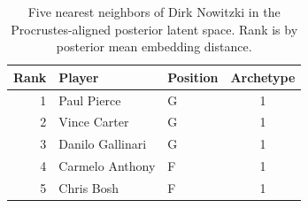 \begin{table}[htbp]
  \centering\small
  \begin{tabular}{rllc}
    \toprule
    Rank & Player & Position & Archetype \\
    \midrule
    1 & Paul Pierce & G & 1 \\
    2 & Vince Carter & G & 1 \\
    3 & Danilo Gallinari & G & 1 \\
    4 & Carmelo Anthony & F & 1 \\
    5 & Chris Bosh & F & 1 \\
    \bottomrule
  \end{tabular}
  \caption{Five nearest neighbors of Dirk Nowitzki in the Procrustes-aligned posterior latent space. Rank is by posterior mean embedding distance.}
  \label{tab:Dirk_Nowitzki_neighbors}
\end{table}

